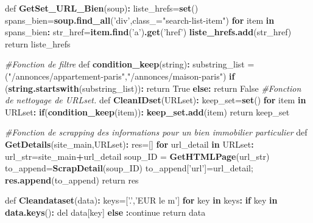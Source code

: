 \documentclass[french,]{article}
\newenvironment{Shaded}{\begin{snugshade}}{\end{snugshade}}
\newcommand{\CommentTok}[1]{\textcolor[rgb]{0.56,0.35,0.01}{\textit{#1}}}
\newcommand{\ControlFlowTok}[1]{\textcolor[rgb]{0.13,0.29,0.53}{\textbf{#1}}}
\newcommand{\DataTypeTok}[1]{\textcolor[rgb]{0.13,0.29,0.53}{#1}}
\newcommand{\KeywordTok}[1]{\textcolor[rgb]{0.13,0.29,0.53}{\textbf{#1}}}
\newcommand{\NormalTok}[1]{#1}
\newcommand{\OperatorTok}[1]{\textcolor[rgb]{0.81,0.36,0.00}{\textbf{#1}}}
\newcommand{\StringTok}[1]{\textcolor[rgb]{0.31,0.60,0.02}{#1}}
\begin{document}
\begin{Shaded}
\begin{Highlighting}[]
\NormalTok{def }\KeywordTok{GetSet_URL_Bien}\NormalTok{(soup)}\OperatorTok{:}
\StringTok{    }\NormalTok{liste_hrefs=}\KeywordTok{set}\NormalTok{()}
\NormalTok{    spans_bien=}\KeywordTok{soup.find_all}\NormalTok{(}\StringTok{'div'}\NormalTok{,}\DataTypeTok{class_=}\StringTok{"search-list-item"}\NormalTok{)}
    \ControlFlowTok{for}\NormalTok{ item }\ControlFlowTok{in}\NormalTok{ spans_bien}\OperatorTok{:}
\StringTok{        }\NormalTok{str_href=}\KeywordTok{item.find}\NormalTok{(}\StringTok{'a'}\NormalTok{)}\KeywordTok{.get}\NormalTok{(}\StringTok{'href'}\NormalTok{)}
        \KeywordTok{liste_hrefs.add}\NormalTok{(str_href)        }
\NormalTok{    return liste_hrefs}

\CommentTok{#Fonction de filtre}
\NormalTok{def }\KeywordTok{condition_keep}\NormalTok{(string)}\OperatorTok{:}
\StringTok{    }\NormalTok{substring_list =}\StringTok{ }\NormalTok{(}\StringTok{"/annonces/appartement-paris"}\NormalTok{,}\StringTok{"/annonces/maison-paris"}\NormalTok{)}
    \ControlFlowTok{if}\NormalTok{ (}\KeywordTok{string.startswith}\NormalTok{(substring_list))}\OperatorTok{:}
\StringTok{        }\NormalTok{return True}
    \ControlFlowTok{else}\OperatorTok{:}
\StringTok{        }\NormalTok{return False}
\CommentTok{#Fonction de nettoyage de URLset. }
\NormalTok{def }\KeywordTok{CleanIDset}\NormalTok{(URLset)}\OperatorTok{:}
\StringTok{    }\NormalTok{keep_set=}\KeywordTok{set}\NormalTok{()}
    \ControlFlowTok{for}\NormalTok{ item }\ControlFlowTok{in}\NormalTok{ URLset}\OperatorTok{:}
\StringTok{        }\ControlFlowTok{if}\NormalTok{(}\KeywordTok{condition_keep}\NormalTok{(item))}\OperatorTok{:}
\StringTok{            }\KeywordTok{keep_set.add}\NormalTok{(item)    }
\NormalTok{    return keep_set}

\CommentTok{#Fonction de scrapping des informations pour un bien immobilier particulier}
\NormalTok{def }\KeywordTok{GetDetails}\NormalTok{(site_main,URLset)}\OperatorTok{:}
\StringTok{    }\NormalTok{res=[]}
    \ControlFlowTok{for}\NormalTok{ url_detail }\ControlFlowTok{in}\NormalTok{ URLset}\OperatorTok{:}
\StringTok{        }\NormalTok{url_str=site_main}\OperatorTok{+}\NormalTok{url_detail}
\NormalTok{        soup_ID =}\StringTok{ }\KeywordTok{GetHTMLPage}\NormalTok{(url_str)}
\NormalTok{        to_append=}\KeywordTok{ScrapDetail}\NormalTok{(soup_ID)}
\NormalTok{        to_append[}\StringTok{'url'}\NormalTok{]=url_detail;}
        \KeywordTok{res.append}\NormalTok{(to_append)}
\NormalTok{    return res}



\NormalTok{def }\KeywordTok{Cleandataset}\NormalTok{(data)}\OperatorTok{:}\StringTok{        }
\StringTok{    }\NormalTok{keys=[}\StringTok{'.'}\NormalTok{,}\StringTok{'EUR le m'}\NormalTok{]}
    \ControlFlowTok{for}\NormalTok{ key }\ControlFlowTok{in}\NormalTok{ keys}\OperatorTok{:}
\StringTok{        }\ControlFlowTok{if}\NormalTok{ key }\ControlFlowTok{in} \KeywordTok{data.keys}\NormalTok{()}\OperatorTok{:}
\StringTok{            }\NormalTok{del data[key]}
        \ControlFlowTok{else} \OperatorTok{:}\NormalTok{continue            }
\NormalTok{    return data}


\end{Highlighting}
\end{Shaded}
\end{document}

